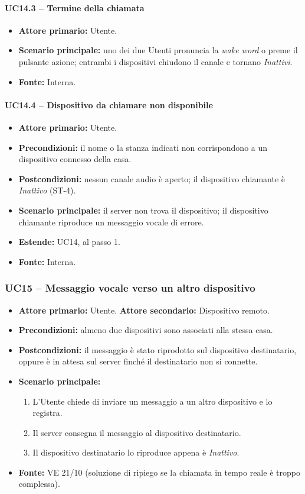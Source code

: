 \documentclass[12pt,a4paper]{article}
\newcommand{\tightlist}{\setlength{\itemsep}{1pt}\setlength{\parskip}{0pt}}
\begin{document}
\paragraph{UC14.3 -- Termine della chiamata}
\begin{itemize}
\tightlist
\item \textbf{Attore primario:} Utente.
\item \textbf{Scenario principale:} uno dei due Utenti pronuncia la \emph{wake word} o preme il pulsante azione; entrambi i dispositivi chiudono il canale e tornano \emph{Inattivi}.
\item \textbf{Fonte:} Interna.
\end{itemize}

\paragraph{UC14.4 -- Dispositivo da chiamare non disponibile}
\begin{itemize}
\tightlist
\item \textbf{Attore primario:} Utente.
\item \textbf{Precondizioni:} il nome o la stanza indicati non corrispondono a un dispositivo connesso della casa.
\item \textbf{Postcondizioni:} nessun canale audio è aperto; il dispositivo chiamante è \emph{Inattivo} (ST-4).
\item \textbf{Scenario principale:} il server non trova il dispositivo; il dispositivo chiamante riproduce un messaggio vocale di errore.
\item \textbf{Estende:} UC14, al passo 1.
\item \textbf{Fonte:} Interna.
\end{itemize}

\subsubsection{UC15 -- Messaggio vocale verso un altro dispositivo}
\begin{itemize}
\tightlist
\item \textbf{Attore primario:} Utente. \textbf{Attore secondario:} Dispositivo remoto.
\item \textbf{Precondizioni:} almeno due dispositivi sono associati alla stessa casa.
\item \textbf{Postcondizioni:} il messaggio è stato riprodotto sul dispositivo destinatario, oppure è in attesa sul server finché il destinatario non si connette.
\item \textbf{Scenario principale:}
\begin{enumerate}
\tightlist
\item L'Utente chiede di inviare un messaggio a un altro dispositivo e lo registra.
\item Il server consegna il messaggio al dispositivo destinatario.
\item Il dispositivo destinatario lo riproduce appena è \emph{Inattivo}.
\end{enumerate}
\item \textbf{Fonte:} VE 21/10 (soluzione di ripiego se la chiamata in tempo reale è troppo complessa).
\end{itemize}
\end{document}
